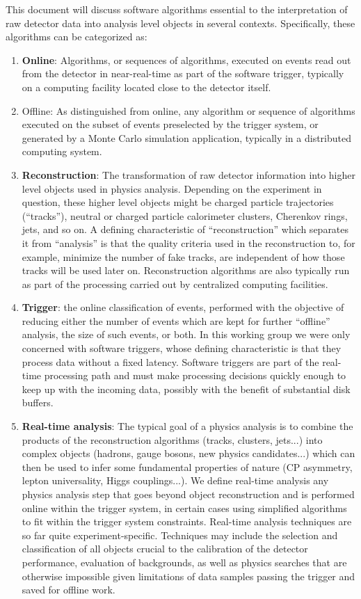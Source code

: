 This document will discuss software algorithms essential to the interpretation of raw detector data into analysis level objects in several contexts. Specifically, these algorithms can be categorized as: 
\begin{enumerate}
\item {\bf Online}: Algorithms, or sequences of algorithms, executed on events read out from the detector in near-real-time as part of the software trigger, typically on a computing facility located close to the detector itself.
\item Offline: As distinguished from online, any algorithm or sequence of algorithms executed on the subset of events preselected by the trigger system, or generated by a Monte Carlo simulation application, typically in a distributed computing system.
\item
{\bf Reconstruction}: The transformation of raw detector information into higher level objects used in physics analysis. Depending on the experiment in question, these higher level objects might be charged particle trajectories (“tracks”), neutral or charged particle calorimeter clusters, Cherenkov rings, jets, and so on. A defining characteristic of “reconstruction” which separates it from “analysis” is that the quality criteria used in the reconstruction to, for example, minimize the number of fake tracks, are independent of how those tracks will be used later on. Reconstruction algorithms are also typically run as part of the processing carried out by centralized computing facilities.
\item
{\bf Trigger}: the online classification of events, performed with the objective of reducing either the number of events which are kept for further “offline” analysis, the size of such events, or both. In this working group we were only concerned with software triggers, whose defining characteristic is that they process data without a fixed latency. Software triggers are part of the real-time processing path and must make processing decisions quickly enough to keep up with the incoming data, possibly with the benefit of substantial disk buffers.
\item
{\bf Real-time analysis}: The typical goal of a physics analysis is to combine the products of the reconstruction algorithms (tracks, clusters, jets...) into complex objects (hadrons, gauge bosons, new physics candidates...) which can then be used to infer some fundamental properties of nature (CP asymmetry, lepton universality, Higgs couplings...). We define real-time analysis any physics analysis step that goes beyond object reconstruction and is performed online within the trigger system, in certain cases using simplified algorithms to fit within the trigger system constraints. Real-time analysis techniques are so far quite experiment-specific. Techniques may include the selection and classification of all objects crucial to the calibration of the detector performance, evaluation of backgrounds, as well as physics searches that are otherwise impossible given limitations of data samples passing the trigger and saved for offline work.
\end{enumerate}

